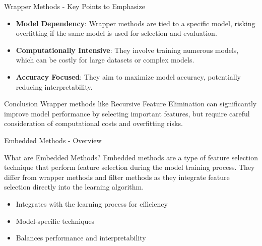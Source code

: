 \documentclass[aspectratio=169]{beamer}
\begin{document}
\begin{frame}[fragile]{Wrapper Methods - Key Points to Emphasize}
    \begin{itemize}
        \item \textbf{Model Dependency}: Wrapper methods are tied to a specific model, risking overfitting if the same model is used for selection and evaluation.
        \item \textbf{Computationally Intensive}: They involve training numerous models, which can be costly for large datasets or complex models.
        \item \textbf{Accuracy Focused}: They aim to maximize model accuracy, potentially reducing interpretability.
    \end{itemize}
    
    \begin{block}{Conclusion}
        Wrapper methods like Recursive Feature Elimination can significantly improve model performance by selecting important features, but require careful consideration of computational costs and overfitting risks.
    \end{block}
\end{frame}

\begin{frame}[fragile]{Embedded Methods - Overview}
    \begin{block}{What are Embedded Methods?}
        Embedded methods are a type of feature selection technique that perform feature selection during the model training process. They differ from wrapper methods and filter methods as they integrate feature selection directly into the learning algorithm.
    \end{block}
    
    \begin{itemize}
        \item Integrates with the learning process for efficiency
        \item Model-specific techniques
        \item Balances performance and interpretability
    \end{itemize}
\end{frame}
\end{document}
